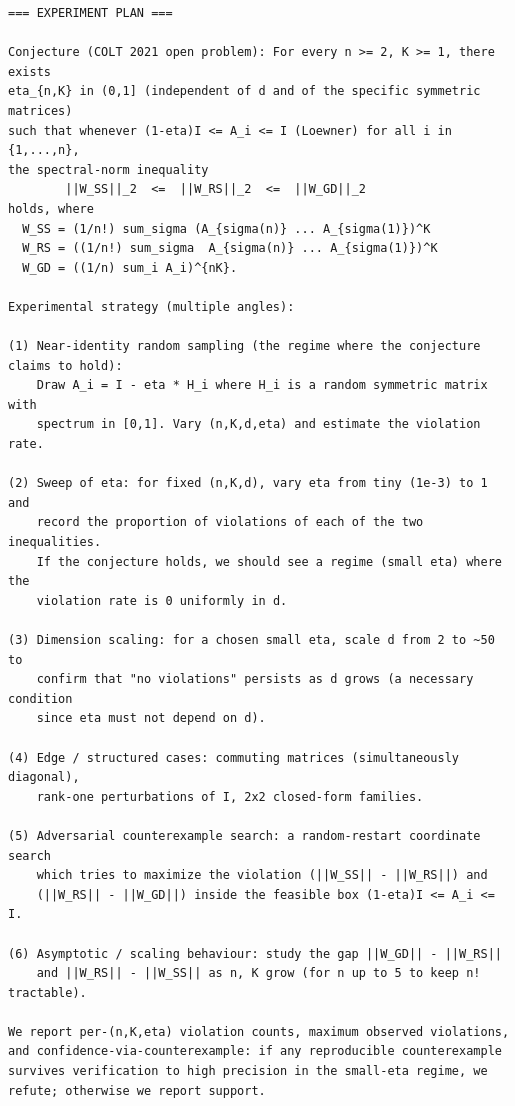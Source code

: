 \documentclass[11pt]{article}
\begin{document}
\begin{lstlisting}
=== EXPERIMENT PLAN ===

Conjecture (COLT 2021 open problem): For every n >= 2, K >= 1, there exists
eta_{n,K} in (0,1] (independent of d and of the specific symmetric matrices)
such that whenever (1-eta)I <= A_i <= I (Loewner) for all i in {1,...,n},
the spectral-norm inequality
        ||W_SS||_2  <=  ||W_RS||_2  <=  ||W_GD||_2
holds, where
  W_SS = (1/n!) sum_sigma (A_{sigma(n)} ... A_{sigma(1)})^K
  W_RS = ((1/n!) sum_sigma  A_{sigma(n)} ... A_{sigma(1)})^K
  W_GD = ((1/n) sum_i A_i)^{nK}.

Experimental strategy (multiple angles):

(1) Near-identity random sampling (the regime where the conjecture claims to hold):
    Draw A_i = I - eta * H_i where H_i is a random symmetric matrix with
    spectrum in [0,1]. Vary (n,K,d,eta) and estimate the violation rate.

(2) Sweep of eta: for fixed (n,K,d), vary eta from tiny (1e-3) to 1 and
    record the proportion of violations of each of the two inequalities.
    If the conjecture holds, we should see a regime (small eta) where the
    violation rate is 0 uniformly in d.

(3) Dimension scaling: for a chosen small eta, scale d from 2 to ~50 to
    confirm that "no violations" persists as d grows (a necessary condition
    since eta must not depend on d).

(4) Edge / structured cases: commuting matrices (simultaneously diagonal),
    rank-one perturbations of I, 2x2 closed-form families.

(5) Adversarial counterexample search: a random-restart coordinate search
    which tries to maximize the violation (||W_SS|| - ||W_RS||) and
    (||W_RS|| - ||W_GD||) inside the feasible box (1-eta)I <= A_i <= I.

(6) Asymptotic / scaling behaviour: study the gap ||W_GD|| - ||W_RS||
    and ||W_RS|| - ||W_SS|| as n, K grow (for n up to 5 to keep n! tractable).

We report per-(n,K,eta) violation counts, maximum observed violations,
and confidence-via-counterexample: if any reproducible counterexample
survives verification to high precision in the small-eta regime, we
refute; otherwise we report support.



\end{lstlisting}
\end{document}

